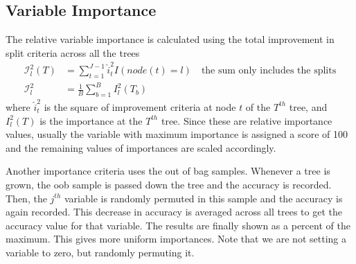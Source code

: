 \documentclass[../statistical_learning_notes.tex]{subfiles}
\begin{document}
    \subsection{Variable Importance}
    The relative variable importance is calculated using the total improvement in split criteria across all the trees
    \begin{align*}
        \mathcal{I}_{l}^{2}(T) &= \sum_{t=1}^{J-1} \hat{i}_{t}^{2}I(node(t) = l) \quad \text{the sum only includes the splits}\\
        \mathcal{I}_{l}^{2} &= \frac{1}{B}\sum_{b=1}^{B} I_{l}^{2}(T_{b})
    \end{align*}
    where $\hat{i}_{t}^{2}$ is the square of improvement criteria at node $t$ of the $T^{th}$ tree, and $I_{l}^{2}(T)$ is the importance at the $T^{th}$ tree. Since these are relative importance values, usually the variable with maximum importance is assigned a score of 100 and the remaining values of importances are scaled accordingly.\newline

    Another importance criteria uses the out of bag samples. Whenever a tree is grown, the oob sample is passed down the tree and the accuracy is recorded. Then, the $j^{th}$ variable is randomly permuted in this sample and the accuracy is again recorded. This decrease in accuracy is averaged across all trees to get the accuracy value for that variable. The results are finally shown as a percent of the maximum. This gives more uniform importances. Note that we are not setting a variable to zero, but randomly permuting it.
\end{document}
